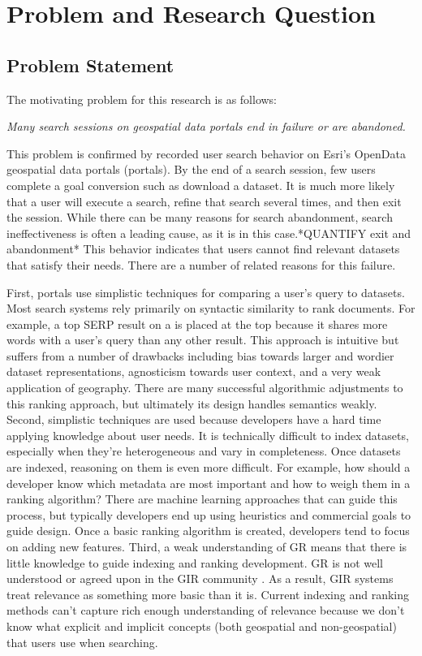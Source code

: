 \chapter{Problem and Research Question} \label{ch:[chapter 3 label]}

\section{Problem Statement}

The motivating problem for this research is as follows:
\linebreak

\emph{Many search sessions on geospatial data portals end in failure or are abandoned.}
\linebreak

This problem is confirmed by recorded user search behavior on Esri's OpenData geospatial data portals (portals). By the end of a search session, few users complete a goal conversion  such as download a dataset. It is much more likely that a user will execute a search, refine that search several times, and then exit the session. While there can be many reasons for search abandonment, search ineffectiveness is often a leading cause, as it is in this case.*QUANTIFY exit and abandonment* This behavior indicates that users cannot find relevant datasets that satisfy their needs. There are a number of related reasons for this failure.

First, portals use simplistic techniques for comparing a user's query to datasets. Most search systems rely primarily on syntactic similarity to rank documents. For example, a top SERP result on a is placed at the top because it shares more words with a user's query than any other result. This approach is intuitive but suffers from a number of drawbacks including bias towards larger and wordier dataset representations, agnosticism towards user context, and a very weak application of geography. There are many successful algorithmic adjustments to this ranking approach, but ultimately its design handles semantics weakly. Second, simplistic techniques are used because developers have a hard time applying knowledge about user needs. It is technically difficult to index datasets, especially when they're heterogeneous and vary in completeness. Once datasets are indexed, reasoning on them is even more difficult. For example, how should a developer know which metadata are most important and how to weigh them in a ranking algorithm? There are machine learning approaches that can guide this process, but typically developers end up using heuristics and commercial goals to guide design. Once a basic ranking algorithm is created, developers tend to focus on adding new features. Third, a weak understanding of GR means that there is little knowledge to guide indexing and ranking development. GR is not well understood or agreed upon in the GIR community \cite{Purves2018}. As a result, GIR systems treat relevance as something more basic than it is. Current indexing and ranking methods can't capture rich enough understanding of relevance because we don't know what explicit and implicit concepts (both geospatial and non-geospatial) that users use when searching.


